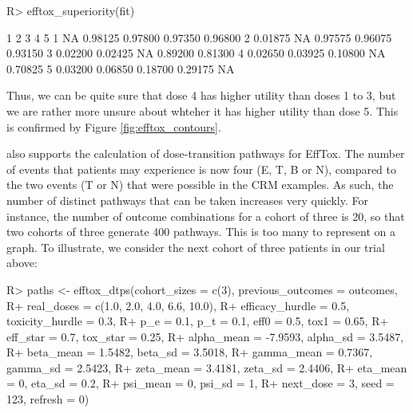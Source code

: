 \documentclass[article]{jss}
\begin{document}
\begin{CodeChunk}

\begin{CodeInput}
R> efftox_superiority(fit)
\end{CodeInput}

\begin{CodeOutput}
        1       2       3       4       5
1      NA 0.98125 0.97800 0.97350 0.96800
2 0.01875      NA 0.97575 0.96075 0.93150
3 0.02200 0.02425      NA 0.89200 0.81300
4 0.02650 0.03925 0.10800      NA 0.70825
5 0.03200 0.06850 0.18700 0.29175      NA
\end{CodeOutput}
\end{CodeChunk}

Thus, we can be quite sure that dose 4 has higher utility than doses 1
to 3, but we are rather more unsure about whteher it has higher utility
than dose 5. This is confirmed by Figure \ref{fig:efftox_contours}.

 also supports the calculation of dose-transition pathways
for EffTox. The number of events that patients may experience is now
four (E, T, B or N), compared to the two events (T or N) that were
possible in the CRM examples. As such, the number of distinct pathways
that can be taken increases very quickly. For instance, the number of
outcome combinations for a cohort of three is 20, so that two cohorts of
three generate 400 pathways. This is too many to represent on a graph.
To illustrate, we consider the next cohort of three patients in our
trial above:

\begin{CodeChunk}

\begin{CodeInput}
R> paths <- efftox_dtps(cohort_sizes = c(3), previous_outcomes = outcomes, 
R+                      real_doses = c(1.0, 2.0, 4.0, 6.6, 10.0),
R+                      efficacy_hurdle = 0.5, toxicity_hurdle = 0.3,
R+                      p_e = 0.1, p_t = 0.1, eff0 = 0.5, tox1 = 0.65,
R+                      eff_star = 0.7, tox_star = 0.25,
R+                      alpha_mean = -7.9593, alpha_sd = 3.5487,
R+                      beta_mean = 1.5482, beta_sd = 3.5018,
R+                      gamma_mean = 0.7367, gamma_sd = 2.5423,
R+                      zeta_mean = 3.4181, zeta_sd = 2.4406,
R+                      eta_mean = 0, eta_sd = 0.2,
R+                      psi_mean = 0, psi_sd = 1, 
R+                      next_dose = 3, seed = 123, refresh = 0)
\end{CodeInput}
\end{CodeChunk}
\end{document}
